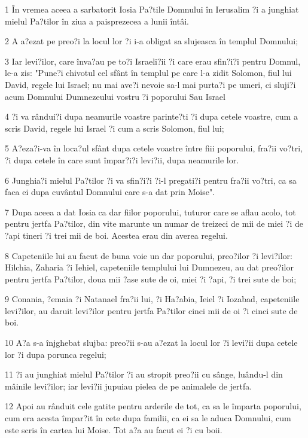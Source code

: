 \par 1 În vremea aceea a sarbatorit Iosia Pa?tile Domnului în Ierusalim ?i a junghiat mielul Pa?tilor în ziua a paisprezecea a lunii întâi.
\par 2 A a?ezat pe preo?i la locul lor ?i i-a obligat sa slujeasca în templul Domnului;
\par 3 Iar levi?ilor, care înva?au pe to?i Israeli?ii ?i care erau sfin?i?i pentru Domnul, le-a zis: "Pune?i chivotul cel sfânt în templul pe care l-a zidit Solomon, fiul lui David, regele lui Israel; nu mai ave?i nevoie sa-l mai purta?i pe umeri, ci sluji?i acum Domnului Dumnezeului vostru ?i poporului Sau Israel
\par 4 ?i va rândui?i dupa neamurile voastre parinte?ti ?i dupa cetele voastre, cum a scris David, regele lui Israel ?i cum a scris Solomon, fiul lui;
\par 5 A?eza?i-va în loca?ul sfânt dupa cetele voastre între fiii poporului, fra?ii vo?tri, ?i dupa cetele în care sunt împar?i?i levi?ii, dupa neamurile lor.
\par 6 Junghia?i mielul Pa?tilor ?i va sfin?i?i ?i-l pregati?i pentru fra?ii vo?tri, ca sa faca ei dupa cuvântul Domnului care s-a dat prin Moise".
\par 7 Dupa aceea a dat Iosia ca dar fiilor poporului, tuturor care se aflau acolo, tot pentru jertfa Pa?tilor, din vite marunte un numar de treizeci de mii de miei ?i de ?api tineri ?i trei mii de boi. Acestea erau din averea regelui.
\par 8 Capeteniile lui au facut de buna voie un dar poporului, preo?ilor ?i levi?ilor: Hilchia, Zaharia ?i Iehiel, capeteniile templului lui Dumnezeu, au dat preo?ilor pentru jertfa Pa?tilor, doua mii ?ase sute de oi, miei ?i ?api, ?i trei sute de boi;
\par 9 Conania, ?emaia ?i Natanael fra?ii lui, ?i Ha?abia, Ieiel ?i Iozabad, capeteniile levi?ilor, au daruit levi?ilor pentru jertfa Pa?tilor cinci mii de oi ?i cinci sute de boi.
\par 10 A?a s-a înjghebat slujba: preo?ii s-au a?ezat la locul lor ?i levi?ii dupa cetele lor ?i dupa porunca regelui;
\par 11 ?i au junghiat mielul Pa?tilor ?i au stropit preo?ii cu sânge, luându-l din mâinile levi?ilor; iar levi?ii jupuiau pielea de pe animalele de jertfa.
\par 12 Apoi au rânduit cele gatite pentru arderile de tot, ca sa le împarta poporului, cum era acesta împar?it în cete dupa familii, ca ei sa le aduca Domnului, cum este scris în cartea lui Moise. Tot a?a au facut ei ?i cu boii.
